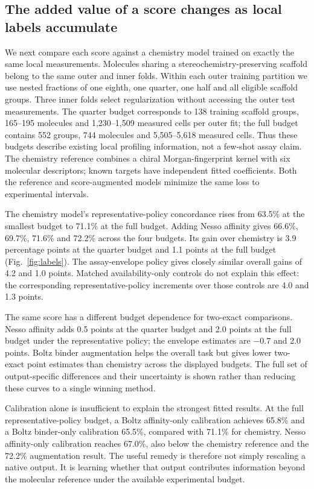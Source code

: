 \documentclass[pdflatex, sn-nature]{sn-jnl}
\begin{document}
\subsection{The added value of a score changes as local labels accumulate}
We next compare each score against a chemistry model trained on exactly the same local measurements. Molecules sharing a stereochemistry-preserving scaffold belong to the same outer and inner folds. Within each outer training partition we use nested fractions of one eighth, one quarter, one half and all eligible scaffold groups. Three inner folds select regularization without accessing the outer test measurements. The quarter budget corresponds to 138 training scaffold groups, 165--195 molecules and 1,230--1,509 measured cells per outer fit; the full budget contains 552 groups, 744 molecules and 5,505--5,618 measured cells. Thus these budgets describe existing local profiling information, not a few-shot assay claim. The chemistry reference combines a chiral Morgan-fingerprint kernel with six molecular descriptors; known targets have independent fitted coefficients. Both the reference and score-augmented models minimize the same loss to experimental intervals.

The chemistry model's representative-policy concordance rises from 63.5\% at the smallest budget to 71.1\% at the full budget. Adding Nesso affinity gives 66.6\%, 69.7\%, 71.6\% and 72.2\% across the four budgets. Its gain over chemistry is 3.9 percentage points at the quarter budget and 1.1 points at the full budget (Fig.~\ref{fig:labels}). The assay-envelope policy gives closely similar overall gains of 4.2 and 1.0 points. Matched availability-only controls do not explain this effect: the corresponding representative-policy increments over those controls are 4.0 and 1.3 points.

The same score has a different budget dependence for two-exact comparisons. Nesso affinity adds 0.5 points at the quarter budget and 2.0 points at the full budget under the representative policy; the envelope estimates are $-0.7$ and 2.0 points. Boltz binder augmentation helps the overall task but gives lower two-exact point estimates than chemistry across the displayed budgets. The full set of output-specific differences and their uncertainty is shown rather than reducing these curves to a single winning method.

Calibration alone is insufficient to explain the strongest fitted results. At the full representative-policy budget, a Boltz affinity-only calibration achieves 65.8\% and a Boltz binder-only calibration 65.5\%, compared with 71.1\% for chemistry. Nesso affinity-only calibration reaches 67.0\%, also below the chemistry reference and the 72.2\% augmentation result. The useful remedy is therefore not simply rescaling a native output. It is learning whether that output contributes information beyond the molecular reference under the available experimental budget.
\end{document}
